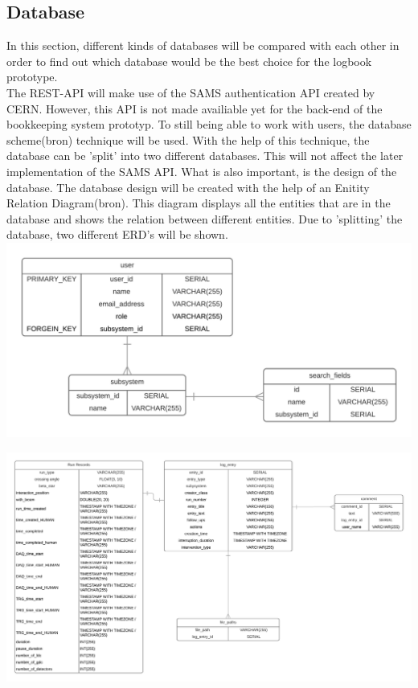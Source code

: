 \documentclass[paper=a4, fontsize=11pt,twoside]{scrartcl}	%
\begin{document}
\subsection{Database}
In this section, different kinds of databases will be compared with each other in order to find out which database would be the best choice for the logbook prototype. \\
The REST-API will make use of the SAMS authentication API created by CERN. However, this API is not made availiable yet for the back-end of the bookkeeping system prototyp. To still being able to work with users, the database scheme(bron) technique will be used. With the help of this technique, the database can be 'split' into two different databases. This will not affect the later implementation of the SAMS API.
What is also important, is the design of the database. The database design will be created with the help of an Enitity Relation Diagram(bron). This diagram displays all the entities that are in the database and shows the relation between different entities. Due to 'splitting' the database, two different ERD's will be shown. \\
\includegraphics[scale=1]{ERDUser}

\includegraphics[scale=0.5]{ERDLogEntry}
\end{document}
